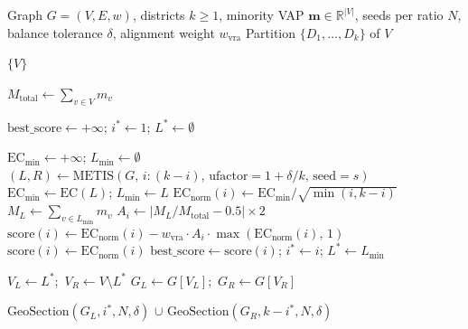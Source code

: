 \begin{algorithm}[H]
\caption{VRASection($G$, $k$, $\mathbf{m}$, $N$, $\delta$, $w_\text{vra}$)}
\label{alg:vrasection}
\begin{algorithmic}[1]
\Require Graph $G = (V, E, w)$, districts $k \geq 1$, minority VAP $\mathbf{m} \in \mathbb{R}^{|V|}$,
  seeds per ratio $N$, balance tolerance $\delta$, alignment weight $w_\text{vra}$
\Ensure Partition $\{D_1, \ldots, D_k\}$ of $V$

 \Return $\{V\}$ \EndIf

\State $M_\text{total} \gets \sum_{v \in V} m_v$
  \hfill{}

\State{}
\State $\mathrm{best\_score} \gets +\infty$;
   $i^* \gets 1$; $L^* \gets \emptyset$

  \State $\mathrm{EC}_{\min} \gets +\infty$; $L_{\min} \gets \emptyset$
    \State $(L, R) \gets \mathrm{METIS}(G,\, i:(k-i),\, \mathrm{ufactor} = 1 + \delta/k,\, \mathrm{seed}=s)$
      $\mathrm{EC}_{\min} \gets \mathrm{EC}(L)$; $L_{\min} \gets L$
    \EndIf
  \EndFor
  \State $\mathrm{EC}_\text{norm}(i) \gets \mathrm{EC}_{\min} / \sqrt{\min(i, k-i)}$
    \hfill{}
    \State $M_L \gets \sum_{v \in L_{\min}} m_v$
    \State $A_i \gets |M_L / M_\text{total} - 0.5| \times 2$
      \hfill{}
    \State $\mathrm{score}(i) \gets \mathrm{EC}_\text{norm}(i)
           - w_\text{vra} \cdot A_i \cdot \max(\mathrm{EC}_\text{norm}(i),\, 1)$
  \Else
    \State $\mathrm{score}(i) \gets \mathrm{EC}_\text{norm}(i)$
      \hfill{}
  \EndIf
    $\mathrm{best\_score} \gets \mathrm{score}(i)$; $i^* \gets i$; $L^* \gets L_{\min}$
  \EndIf
\EndFor

\State{}
\State $V_L \gets L^*$;\ $V_R \gets V \setminus L^*$
\State $G_L \gets G[V_L]$;\ $G_R \gets G[V_R]$
  \hfill{}

\State \Return $\mathrm{GeoSection}(G_L, i^*, N, \delta)$
         $\cup$ $\mathrm{GeoSection}(G_R, k - i^*, N, \delta)$
\end{algorithmic}
\end{algorithm}

